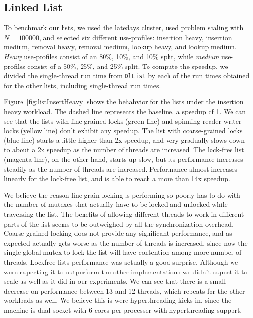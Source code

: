 \documentclass[11pt]{article}
\begin{document}
\subsection{Linked List}
To benchmark our lists, we used the latedays cluster, used problem scaling with
$N=100000$, and selected six different use-profiles: insertion heavy, insertion
medium, removal heavy, removal medium, lookup heavy, and lookup medium. {\it
Heavy} use-profiles consist of an 80\%, 10\%, and 10\% split, while {\it
medium} use-profiles consist of a 50\%, 25\%, and 25\% split. To compute the
speedup, we divided the single-thread run time from {\tt DlList} by each of the
run times obtained for the other lists, including single-thread run times.

Figure~\ref{fig:listInsertHeavy} shows the behahvior for the lists under the
insertion heavy workload. The dashed line represents the baseline, a speedup of
1. We can see that the lists with fine-grained locks (green line) and
spinning-reader-writer locks (yellow line) don't exhibit any speedup. The list
with coarse-grained locks (blue line) starts a little higher than 2x speedup,
and very gradually slows down to about a 2x speedup as the number of threads are
increased. The lock-free list (magenta line), on the other hand, starts up slow,
but its performance increases steadily as the number of threads are increased.
Performance almost increases linearly for the lock-free list, and is able to
reach a more than 14x speedup.

We believe the reason fine-grain locking is performing so poorly has to do with
the number of mutexes that actually have to be locked and unlocked while traversing
the list. The benefits of allowing different threads to work in different parts
of the list seems to be outweighed by all the synchronization overhead.
Coarse-grained locking does not provide any significant performance, and as expected
actually gets worse as the number of threads is increased, since now the single
global mutex to lock the list will have contention among more number of threads.
Lockfree lists performance was actually a good surprise. Although we were expecting
it to outperform the other implementations we didn't expect it to scale as well
as it did in our experiments. We can see that there is a small decrease on performance
between 13 and 12 threads, which repeats for the other workloads as well. We believe
this is were hyperthreading kicks in, since the machine is dual socket with 6 cores
per processor with hyperthreading support.
\end{document}
